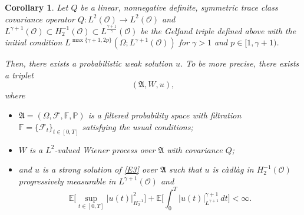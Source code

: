 \documentclass[english,a4paper,11pt]{amsart}
\theoremstyle{plain}
\newtheorem{corollary}[theorem]{Corollary}
\theoremstyle{definition}
\theoremstyle{remark}
\numberwithin{equation}{section}
\newcommand{\CO}{{{ \mathcal O }}}
\newcommand{\EE}{ \mathbb{E} }
\newcommand{\Fcal} {{\mathcal F}}
\newcommand{\Afrak} {{\mathfrak A}}
\renewcommand{\P}{\mathbb{P}}
\begin{document}
 \begin{corollary}\label{ExistencePorousGrad}
Let $Q$ be a  linear, nonnegative definite, symmetric trace class covariance
	operator $Q:L^2(\CO)\to L^2(\CO)$ and  $L^{\gamma+1}(\CO) \subset H_2^{-1}(\CO) \subset L^{\frac{\gamma+1}{\gamma}}(\CO) $ be the Gelfand triple  defined above with the initial condition $L^{\max\{\gamma+1,2p\}}(\Omega;L^{\gamma+1}(\mathcal{O}))$ for $\gamma>1$ and $p\in [1,\gamma+1)$.
	
	Then, there exists a probabilistic weak solution $u$.
	To be more precise, there exists a triplet
	$$
	(\mathfrak{A},  W,u),
	$$
	where 
	\begin{itemize}
		\item $\Afrak=(\Omega,\Fcal,\mathbb{F},\P)$ is a filtered probability space
		with filtration $\mathbb{F}=\{\Fcal_{t}\}_{t\in [0,T]}$ satisfying the usual conditions;
		\item $W$ is a $L^2$-valued Wiener process over $\mathfrak{A}$ with covariance $Q$;
		\item and $u$ is a strong solution of \eqref{E3} over $\mathfrak{A}$ such that $u$ is c\`adl\`ag in $H_2^{-1}(\CO)$ progressively measurable in $L^{\gamma+1}(\CO)$ and
		$$
		\EE\bigg[\sup_{t\in[0,T]} | u(t) | _{H_2^{-1}}^2\bigg] +\EE\bigg[\int_0^T | u(t) | _{L^{\gamma+1}}^{\gamma+1}\,dt\bigg] <\infty.
		$$
	\end{itemize}
\end{corollary}
\end{document}
